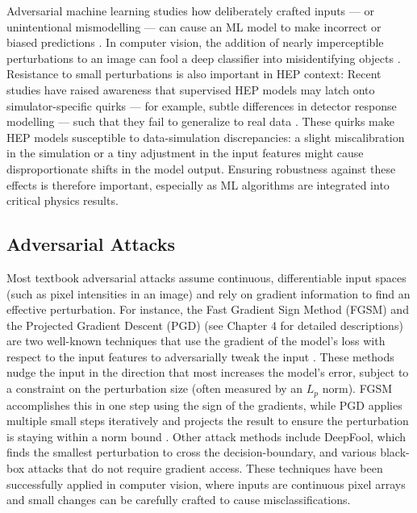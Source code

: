 Adversarial machine learning studies how deliberately crafted inputs — or unintentional mismodelling — can cause an ML model to make incorrect or biased predictions \cite{doi:10.1142/12294}. In computer vision, the addition of nearly imperceptible perturbations to an image can fool a deep classifier into misidentifying objects \cite{goodfellow2015explainingharnessingadversarialexamples}. Resistance to small perturbations is also important in HEP context: Recent studies have raised awareness that supervised HEP models may latch onto simulator-specific quirks — for example, subtle differences in detector response modelling — such that they fail to generalize to real data \cite{PhysRevD.112.016004}. These quirks make HEP models susceptible to data-simulation discrepancies: a slight miscalibration in the simulation or a tiny adjustment in the input features might cause disproportionate shifts in the model output. Ensuring robustness against these effects is therefore important, especially as ML algorithms are integrated into critical physics results.  

\subsection{Adversarial Attacks}

Most textbook adversarial attacks assume continuous, differentiable input spaces (such as pixel intensities in an image) and rely on gradient information to find an effective perturbation. For instance, the Fast Gradient Sign Method (FGSM) and the Projected Gradient Descent (PGD) (see Chapter 4 for detailed descriptions) are two well-known techniques that use the gradient of the model’s loss with respect to the input features to adversarially tweak the input \cite{goodfellow2015explainingharnessingadversarialexamples}. These methods nudge the input in the direction that most increases the model’s error, subject to a constraint on the perturbation size (often measured by an $L_p$ norm). FGSM accomplishes this in one step using the sign of the gradients, while PGD applies multiple small steps iteratively and projects the result to ensure the perturbation is staying within a norm bound \cite{madry2019deeplearningmodelsresistant}. Other attack methods include DeepFool, which finds the smallest perturbation to cross the decision-boundary, and various black-box attacks that do not require gradient access. These techniques have been successfully applied in computer vision, where inputs are continuous pixel arrays and small changes can be carefully crafted to cause misclassifications.

